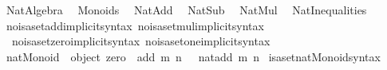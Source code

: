 %
\begin{isabellebody}%
%
%
\isadelimdocument
%
\endisadelimdocument
%
\isatagdocument
\isanewline
\isanewline
%
\isamarkuptrue%
%
\endisatagdocument
{\isafolddocument}%
%
\isadelimdocument
%
\endisadelimdocument
%
\isadelimtheory
%
\endisadelimtheory
%
\isatagtheory
{}\isamarkupfalse%
\ Nat{\isacharunderscore}{\kern0pt}Algebra\isanewline
{}\isanewline
\ \ Monoids\isanewline
\ \ Nat{\isacharunderscore}{\kern0pt}Add\isanewline
\ \ Nat{\isacharunderscore}{\kern0pt}Sub\isanewline
\ \ Nat{\isacharunderscore}{\kern0pt}Mul\isanewline
\ \ Nat{\isacharunderscore}{\kern0pt}Inequalities\isanewline
{}%
\endisatagtheory
{\isafoldtheory}%
%
\isadelimtheory
\isanewline
%
\endisadelimtheory
\isanewline
\isanewline
{}\isamarkupfalse%
\ no{\isacharunderscore}{\kern0pt}isa{\isacharunderscore}{\kern0pt}set{\isacharunderscore}{\kern0pt}add{\isacharunderscore}{\kern0pt}implicit{\isacharunderscore}{\kern0pt}syntax\ no{\isacharunderscore}{\kern0pt}isa{\isacharunderscore}{\kern0pt}set{\isacharunderscore}{\kern0pt}mul{\isacharunderscore}{\kern0pt}implicit{\isacharunderscore}{\kern0pt}syntax\isanewline
\ \ no{\isacharunderscore}{\kern0pt}isa{\isacharunderscore}{\kern0pt}set{\isacharunderscore}{\kern0pt}zero{\isacharunderscore}{\kern0pt}implicit{\isacharunderscore}{\kern0pt}syntax\ no{\isacharunderscore}{\kern0pt}isa{\isacharunderscore}{\kern0pt}set{\isacharunderscore}{\kern0pt}one{\isacharunderscore}{\kern0pt}implicit{\isacharunderscore}{\kern0pt}syntax%
\isadelimdocument
%
\endisadelimdocument
%
\isatagdocument
%
\isamarkuptrue%
%
\endisatagdocument
{\isafolddocument}%
%
\isadelimdocument
%
\endisadelimdocument
{}\isamarkupfalse%
\ {\isachardoublequoteopen}nat{\isacharunderscore}{\kern0pt}Monoid\ {\isasymequiv}\ object\ {\isacharbraceleft}{\kern0pt}{\isasymlangle}{\isacharat}{\kern0pt}zero{\isacharcomma}{\kern0pt}\ {}{\isasymrangle}{\isacharcomma}{\kern0pt}\ {\isasymlangle}{\isacharat}{\kern0pt}add{\isacharcomma}{\kern0pt}\ {\isasymlambda}m\ n\ {\isasymin}\ {\isasymnat}{\isachardot}{\kern0pt}\ nat{\isacharunderscore}{\kern0pt}add\ m\ n{\isasymrangle}{\isacharbraceright}{\kern0pt}{\isachardoublequoteclose}\isanewline
\isanewline
{}\isamarkupfalse%
\ isa{\isacharunderscore}{\kern0pt}set{\isacharunderscore}{\kern0pt}nat{\isacharunderscore}{\kern0pt}Monoid{\isacharunderscore}{\kern0pt}syntax\isanewline

\end{isabellebody}
